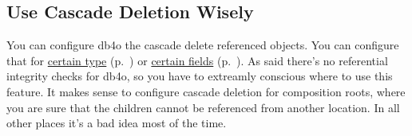 \subsection*{Use Cascade Deletion Wisely}

You can configure db4o the cascade delete referenced objects. You can configure that for \hyperref[ref:configuration-objectclass-cascade-on-delete]{certain type} (p.~\pageref{ref:configuration-objectclass-cascade-on-delete}) or \hyperref[ref:configuration-objectfield-configuration]{certain fields} (p.~\pageref{ref:configuration-objectfield-configuration}). As said there's no referential integrity checks for db4o, so you have to extreamly conscious where to use this feature. It makes sense to configure cascade deletion for composition roots, where you are sure that the children cannot be referenced from another location. In all other places it's a bad idea most of the time.

